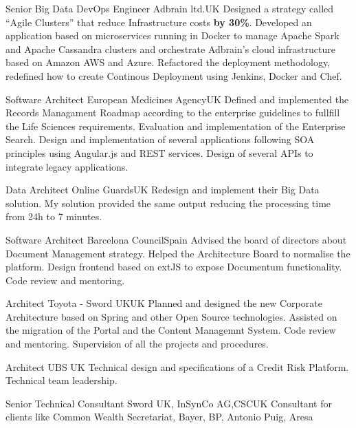\documentclass[10pt, a4paper]{moderncv}
\begin{document}
\cvline{}{}

{Senior Big Data DevOps Engineer}
{Adbrain ltd.}{UK}{}
{Designed a strategy called  ``Agile Clusters'' that reduce Infrastructure costs \textbf{by 30\%}. Developed an application based on microservices running in Docker to manage Apache Spark and Apache Cassandra clusters and orchestrate Adbrain's cloud infrastructure based on Amazon AWS and Azure. Refactored the deployment methodology, redefined how to create Continous Deployment using Jenkins, Docker and Chef.\\}

\cvline{}{}


{Software Architect}
{European Medicines Agency}{UK}{}
{Defined and implemented the Records Managament Roadmap according to the enterprise guidelines to fullfill the Life Sciences requirements. Evaluation and implementation of the Enterprise Search. Design and implementation of several applications following SOA principles using Angular.js and REST services. Design of several APIs to integrate legacy applications.\\}


{Data Architect}
{Online Guards}{UK}{}
{Redesign and implement their Big Data solution. My solution provided the same output reducing the processing time from 24h to 7 minutes.\\}

{Software Architect}
{Barcelona Council}{Spain}{}
{Advised the board of directors about Document Management strategy. Helped the Architecture Board to normalise the platform. Design frontend based on extJS to expose Documentum functionality. Code review and mentoring.\\}

{Architect}
{Toyota - Sword UK}{UK}{}
{Planned and designed the new Corporate Architecture based on Spring and other Open Source technologies. Assisted on the migration of the Portal and the Content Managemnt System. Code review and mentoring. Supervision of all the projects and procedures.\\}

{Architect}
{UBS }{UK}{}
{Technical design and specifications of a Credit Risk Platform. Technical team leadership.\\}

{Senior Technical Consultant}
{Sword UK, InSynCo AG,CSC}{UK}{}
{Consultant for clients like Common Wealth Secretariat, Bayer, BP, Antonio Puig, Aresa\\}
\end{document}
